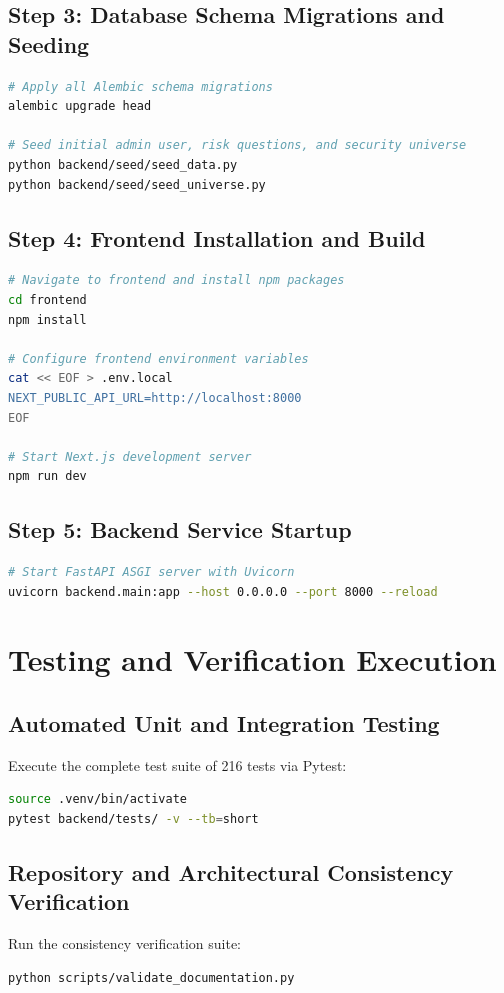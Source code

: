 \subsection{Step 3: Database Schema Migrations and Seeding}
\begin{lstlisting}[language=bash]
# Apply all Alembic schema migrations
alembic upgrade head

# Seed initial admin user, risk questions, and security universe
python backend/seed/seed_data.py
python backend/seed/seed_universe.py
\end{lstlisting}

\subsection{Step 4: Frontend Installation and Build}
\begin{lstlisting}[language=bash]
# Navigate to frontend and install npm packages
cd frontend
npm install

# Configure frontend environment variables
cat << EOF > .env.local
NEXT_PUBLIC_API_URL=http://localhost:8000
EOF

# Start Next.js development server
npm run dev
\end{lstlisting}

\subsection{Step 5: Backend Service Startup}
\begin{lstlisting}[language=bash]
# Start FastAPI ASGI server with Uvicorn
uvicorn backend.main:app --host 0.0.0.0 --port 8000 --reload
\end{lstlisting}

\section{Testing and Verification Execution}

\subsection{Automated Unit and Integration Testing}
Execute the complete test suite of 216 tests via Pytest:
\begin{lstlisting}[language=bash]
source .venv/bin/activate
pytest backend/tests/ -v --tb=short
\end{lstlisting}

\subsection{Repository and Architectural Consistency Verification}
Run the consistency verification suite:
\begin{lstlisting}[language=bash]
python scripts/validate_documentation.py
\end{lstlisting}

